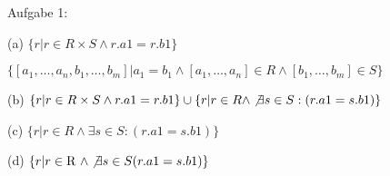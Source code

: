 Aufgabe 1:

(a) $ \{ r | r \in R \times S \land r.a1=r.b1 \} $

$ \{ [a_1, \ldots, a_n, b_1, \ldots, b_m] | a_1=b_1 \land [a_1, \ldots, a_n] \in R \land [b_1, \ldots, b_m] \in S \} $ 

(b) $ \{ r | r \in R \times S \land r.a1=r.b1 \} \cup \{ r | r \in R \land \not\exists s \in S:(r.a1=s.b1) \} $

(c) $ \{ r | r \in R \land \exists s \in S:(r.a1=s.b1) \} $

(d) $ \{ r | r \in \hbox{R } \land \not\exists s \in S(r.a1=s.b1) \} $

\bye
